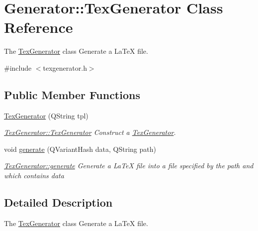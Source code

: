 \hypertarget{classGenerator_1_1TexGenerator}{\section{Generator\-:\-:Tex\-Generator Class Reference}
\label{classGenerator_1_1TexGenerator}
}


The \hyperlink{classGenerator_1_1TexGenerator}{Tex\-Generator} class Generate a La\-Te\-X file.  




{\ttfamily \#include $<$texgenerator.\-h$>$}

\subsection*{Public Member Functions}
\begin{DoxyCompactItemize}
\item 
\hyperlink{classGenerator_1_1TexGenerator_ade851f7c789f66769bbdace3c4a37eef}{Tex\-Generator} (Q\-String tpl)
\begin{DoxyCompactList}\small\item\em \hyperlink{classGenerator_1_1TexGenerator_ade851f7c789f66769bbdace3c4a37eef}{Tex\-Generator\-::\-Tex\-Generator} Construct a \hyperlink{classGenerator_1_1TexGenerator}{Tex\-Generator}. \end{DoxyCompactList}\item 
void \hyperlink{classGenerator_1_1TexGenerator_a5862fde82e703176d1cdaa33d3ac3db5}{generate} (Q\-Variant\-Hash data, Q\-String path)
\begin{DoxyCompactList}\small\item\em \hyperlink{classGenerator_1_1TexGenerator_a5862fde82e703176d1cdaa33d3ac3db5}{Tex\-Generator\-::generate} Generate a La\-Te\-X file into a file specified by the {\itshape path} and which contains {\itshape data} \end{DoxyCompactList}\end{DoxyCompactItemize}


\subsection{Detailed Description}
The \hyperlink{classGenerator_1_1TexGenerator}{Tex\-Generator} class Generate a La\-Te\-X file. 

